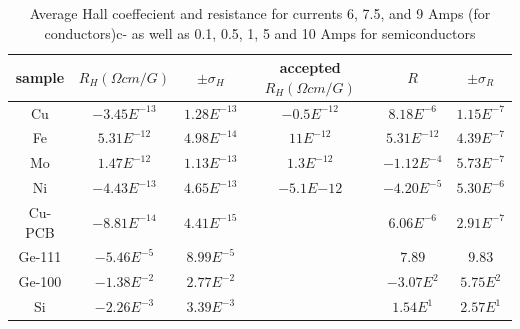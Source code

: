 \documentclass[a4paper,12pt,english]{all-in-one} %
\begin{document}
\begin{table}[]
\centering
\begin{tabular}{c|c|c|c|c|c}
sample & $R_H ({\Omega} cm/G)$  &  $\pm \sigma_{H}$ & accepted $R_H ({\Omega}cm/G)$ & $R$ & $\pm \sigma_{R}$ \\ \hline

Cu & $-3.45E^{-13}$ & $1.28E^{-13}$ & $-0.5E^{-12}$ & $8.18E^{-6}$ & $1.15E^{-7}$ \\
Fe & $5.31E^{-12}$ & $4.98E^{-14}$ & $11E^{-12}$ & $5.31E^{-12}$ & $4.39E^{-7}$ \\
Mo & $1.47E^{-12}$ & $1.13E^{-13}$ & $1.3E^{-12}$ & $-1.12E^{-4}$ & $5.73E^{-7}$ \\
Ni & $-4.43E^{-13}$ & $4.65E^{-13}$ & $-5.1E{-12}$ & $-4.20E^{-5}$ & $5.30E^{-6}$ \\
Cu-PCB & $-8.81E^{-14}$ & $4.41E^{-15}$ & & $6.06E^{-6}$ & $2.91E^{-7}$ \\
Ge-111 & $-5.46E^{-5}$ & $8.99E^{-5}$ & & $7.89$ & $9.83$ \\
Ge-100 & $-1.38E^{-2}$ & $2.77E^{-2}$ & &  $-3.07E^{2}$ & $5.75E^{2}$ \\
Si & $-2.26E^{-3}$ & $3.39E^{-3}$ & & $1.54E^{1}$ & $2.57E^{1}$ \\
\end{tabular}
\caption{Average Hall coeffecient and resistance for currents 6, 7.5, and 9 Amps (for conductors)c- as well as 0.1, 0.5, 1, 5 and 10 Amps for semiconductors}
\label{tab:hall_hv_resis}
\end{table}
\end{document}
